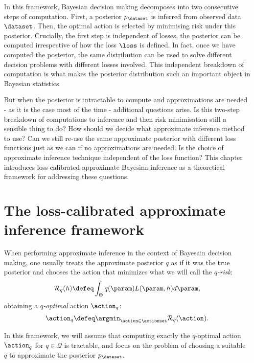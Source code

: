 In this framework, Bayesian decision making decomposes into two consecutive steps of computation. First, a posterior $p_\dataset$ is inferred from observed data $\dataset$. Then, the optimal action is selected by minimising risk under this posterior. Crucially, the first step is independent of losses, the posterior can be computed irrespective of how the loss $\loss$ is defined. In fact, once we have computed the posterior, the same distribution can be used to solve different decision problems with different losses involved. This independent breakdown of computation is what makes the posterior distribution such an important object in Bayesian statistics.

But when the posterior is intractable to compute and approximations are needed - as it is the case most of the time - additional questions arise. Is this two-step breakdown of computations to inference and then risk minimisation still a sensible thing to do? How should we decide what approximate inference method to use? Can we still re-use the same approximate posterior with different loss functions just as we can if no approximations are needed. Is the choice of approximate inference technique independent of the loss function? This chapter introduces loss-calibrated approximate Bayesian inference as a theoretical framework for addressing these questions.

\section{The loss-calibrated approximate inference framework}

When performing approximate inference in the context of Bayesain decision making, one usually treats the approximate posterior $q$ as if it was the true posterior and chooses the action that minimizes what we will call the \emph{$q$-risk}:
\begin{equation} \label{e:q-risk}
	\mathcal{R}_q(h) \defeq \int_\Theta q(\param) L(\param,h) d\param ,
\end{equation}
obtaining a \emph{$q$-optimal} action $\action_q$:
\begin{equation}
	\action_q \defeq \argmin_{\action \in \actionset} \mathcal{R}_q(\action).
\end{equation}

In this framework, we will assume that computing exactly the $q$-optimal action $\action_q$ for $q \in \mathcal{Q}$ is tractable, and focus on the problem of choosing a suitable $q$ to approximate the posterior $p_\dataset$.

